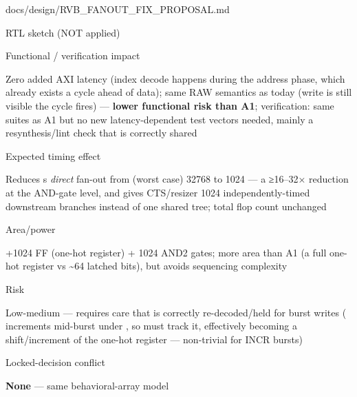 \begin{relocated}{docs/design/RVB_FANOUT_FIX_PROPOSAL.md}
\begin{rowtable}
\begin{rowcell}{RTL sketch (NOT applied)}
\end{rowcell}

\begin{rowcell}{Functional / verification impact}

Zero added AXI latency (index decode happens during the address phase,
which already exists a cycle ahead of data); same RAW semantics as today
(write is still visible the cycle  fires) ---
\textbf{lower functional risk than A1}; verification: same suites as A1
but no new latency-dependent test vectors needed, mainly a
resynthesis/\allowbreak{}lint check that  is correctly
shared

\end{rowcell}

\begin{rowcell}{Expected timing effect}

Reduces \textquotesingle s \emph{direct} fan-out from
(worst case) 32768 to 1024 --- a ≥16--32× reduction at the AND-gate
level, and gives CTS/\allowbreak{}resizer 1024 independently-timed
downstream branches instead of one shared tree; total flop count
unchanged

\end{rowcell}

\begin{rowcell}{Area/\allowbreak{}power}

+1024 FF (one-hot register) + 1024 AND2 gates; more area than A1 (a full
one-hot register vs \textasciitilde64 latched bits), but avoids
sequencing complexity

\end{rowcell}

\begin{rowcell}{Risk}

Low-medium --- requires care that  is correctly
re-decoded/\allowbreak{}held for burst writes ( increments
mid-burst under , so  must track it,
effectively becoming a shift/\allowbreak{}increment of the one-hot
register --- non-trivial for INCR bursts)

\end{rowcell}

\begin{rowcell}{Locked-decision conflict}

\textbf{None} --- same behavioral-array model

\end{rowcell}



\end{rowtable}
\end{relocated}
